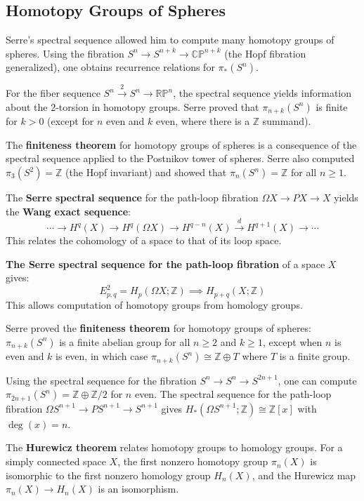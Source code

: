\subsection{Homotopy Groups of Spheres}

Serre's spectral sequence allowed him to compute many homotopy groups of spheres. Using the fibration $S^n \to S^{n+k} \to \mathbb{CP}^{n+k}$ (the Hopf fibration generalized), one obtains recurrence relations for $\pi_*(S^n)$.

For the fiber sequence $S^n \xrightarrow{2} S^n \to \mathbb{RP}^n$, the spectral sequence yields information about the 2-torsion in homotopy groups. Serre proved that $\pi_{n+k}(S^n)$ is finite for $k > 0$ (except for $n$ even and $k$ even, where there is a $\mathbb{Z}$ summand).

The \textbf{finiteness theorem} for homotopy groups of spheres is a consequence of the spectral sequence applied to the Postnikov tower of spheres. Serre also computed $\pi_3(S^2) = \mathbb{Z}$ (the Hopf invariant) and showed that $\pi_n(S^n) = \mathbb{Z}$ for all $n \geq 1$.

The \textbf{Serre spectral sequence} for the path-loop fibration $\Omega X \to PX \to X$ yields the \textbf{Wang exact sequence}:
\[\cdots \to H^q(X) \to H^q(\Omega X) \to H^{q-n}(X) \xrightarrow{d} H^{q+1}(X) \to \cdots\]
This relates the cohomology of a space to that of its loop space.

\textbf{The Serre spectral sequence for the path-loop fibration} of a space $X$ gives:
\[E^2_{p,q} = H_p(\Omega X; \mathbb{Z}) \implies H_{p+q}(X; \mathbb{Z})\]
This allows computation of homotopy groups from homology groups.

Serre proved the \textbf{finiteness theorem} for homotopy groups of spheres: $\pi_{n+k}(S^n)$ is a finite abelian group for all $n \geq 2$ and $k \geq 1$, except when $n$ is even and $k$ is even, in which case $\pi_{n+k}(S^n) \cong \mathbb{Z} \oplus T$ where $T$ is a finite group.

Using the spectral sequence for the fibration $S^n \to S^n \to S^{2n+1}$, one can compute $\pi_{2n+1}(S^n) = \mathbb{Z} \oplus \mathbb{Z}/2$ for $n$ even. The spectral sequence for the path-loop fibration $\Omega S^{n+1} \to PS^{n+1} \to S^{n+1}$ gives $H_*(\Omega S^{n+1}; \mathbb{Z}) \cong \mathbb{Z}[x]$ with $\deg(x) = n$.

The \textbf{Hurewicz theorem} relates homotopy groups to homology groups. For a simply connected space $X$, the first nonzero homotopy group $\pi_n(X)$ is isomorphic to the first nonzero homology group $H_n(X)$, and the Hurewicz map $\pi_n(X) \to H_n(X)$ is an isomorphism.

